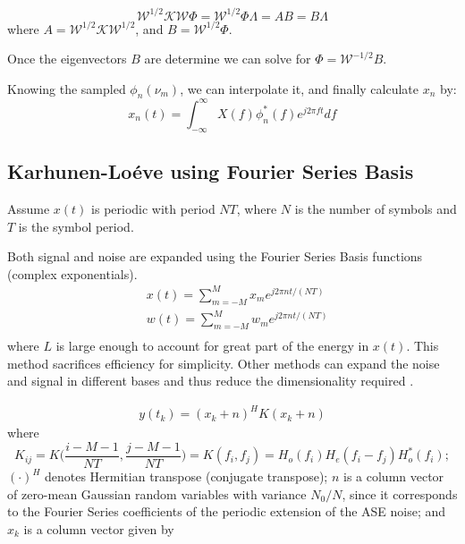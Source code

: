 \documentclass[a4paper]{article}
\begin{document}
\begin{equation} \label{eq:matrix-form}
\mathcal{W}^{1/2}\mathcal{K}\mathcal{W}\Phi = \mathcal{W}^{1/2}\Phi\Lambda = AB = B\Lambda
\end{equation}
where $A = \mathcal{W}^{1/2}\mathcal{K}\mathcal{W}^{1/2}$, and $B = \mathcal{W}^{1/2}\Phi$.

Once the eigenvectors $B$ are determine we can solve for $\Phi = \mathcal{W}^{-1/2}B$.

Knowing the sampled $\phi_n(\nu_m)$, we can interpolate it, and finally calculate $x_n$ by:
\begin{equation}
x_n(t) = \int_{-\infty}^{\infty}X(f)\phi_n^*(f)e^{j2\pi ft}df
\end{equation}

\subsection{Karhunen-Loéve using Fourier Series Basis}

Assume $x(t)$ is periodic with period $NT$, where $N$ is the number of symbols and $T$ is the symbol period.

Both signal and noise are expanded using the Fourier Series Basis functions (complex exponentials). 
\begin{align} \label{fourier-series}
& x(t) = \sum_{m=-M}^M x_me^{j2\pi n t/(NT)} \\
& w(t) = \sum_{m=-M}^M w_me^{j2\pi n t/(NT)} \\
\end{align}
where $L$ is large enough to account for great part of the energy in $x(t)$. This method sacrifices efficiency for simplicity. Other methods can expand the noise and signal in different bases and thus reduce the dimensionality required \cite{forestieri}.

\begin{align} \nonumber
y(t_k) = (x_k + n)^HK(x_k + n)
\end{align}
where
\begin{equation}
K_{ij} = K\bigg(\frac{i-M-1}{NT}, \frac{j-M-1}{NT}\bigg)  = K(f_i, f_j) = H_o(f_i)H_e(f_i-f_j)H_o^*(f_i);
\end{equation}
$(\cdot)^H$ denotes Hermitian transpose (conjugate transpose); $n$ is a column vector of zero-mean Gaussian random variables with variance $N_0/N$, since it corresponds to the Fourier Series coefficients of the periodic extension of the ASE noise; and $x_k$ is a column vector given by
\end{document}
